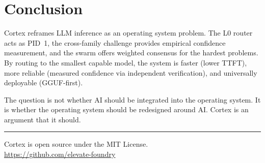 \documentclass[11pt, a4paper, twocolumn]{article}
\begin{document}
\section{Conclusion}

Cortex reframes LLM inference as an operating system problem. The L0 router acts as PID~1, the cross-family challenge provides empirical confidence measurement, and the swarm offers weighted consensus for the hardest problems. By routing to the smallest capable model, the system is faster (lower TTFT), more reliable (measured confidence via independent verification), and universally deployable (GGUF-first).

The question is not whether AI should be integrated into the operating system. It is whether the operating system should be redesigned around AI. Cortex is an argument that it should.

\vspace{1em}
\noindent\rule{\columnwidth}{0.4pt}
\small
\noindent Cortex is open source under the MIT License. \\
\url{https://github.com/elevate-foundry}
\end{document}
